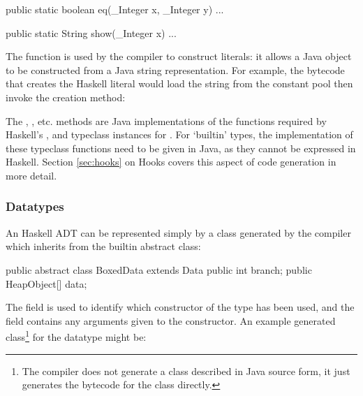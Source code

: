 \documentclass[dissertation.tex]{subfiles}
\begin{document}
{{{\begin{javafigure}
{                public static boolean eq(_Integer x, _Integer y) { ... }

                public static String show(_Integer x) { ... }
            }
            \end{javafigure}

            The  function is used by the compiler to construct  literals: it allows a Java  object to be constructed from a Java string representation. For example, the bytecode that creates the Haskell literal  would load the string  from the constant pool then invoke the creation method:


            The , , etc. methods are Java implementations of the functions required by Haskell's ,  and  typeclass instances for . For `builtin' types, the implementation of these typeclass functions need to be given in Java, as they cannot be expressed in Haskell. Section \ref{sec:hooks} on Hooks covers this aspect of code generation in more detail.
        }
        \subsubsection{Datatypes}
        {
            An Haskell ADT can be represented simply by a class generated by the compiler which inherits from the  builtin abstract class:

            \begin{javafigure}
            public abstract class BoxedData extends Data {
                public int branch;
                public HeapObject[] data;
            }
            \end{javafigure}

            The  field is used to identify which constructor of the type has been used, and the  field contains any arguments given to the constructor. An example generated class\footnote{The compiler does not generate a class described in Java source form, it just generates the bytecode for the class directly.} for the datatype  might be:

}}}
\end{document}
